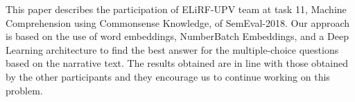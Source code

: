 This paper describes the participation of ELiRF-UPV team at task 11, Machine Comprehension using Commonsense Knowledge, of SemEval-2018. Our approach is based on the use of word embeddings, NumberBatch Embeddings, and a Deep Learning architecture to find the best answer for the multiple-choice questions based on the narrative text. The results obtained are in line with those obtained by the other participants and they encourage us to continue working on this problem.
